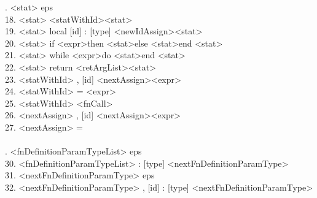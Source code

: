 \documentclass[a4paper, 12pt]{article}
\begin{document}
\begin{tabbing}
. \textless stat\textgreater                       \> \textrightarrow \>  eps \\
18. \textless stat\textgreater                       \> \textrightarrow \>  [id] \textless statWithId\textgreater \textless stat\textgreater \\
19. \textless stat\textgreater                       \> \textrightarrow \>  local [id] : [type] \textless newIdAssign\textgreater \textless stat\textgreater \\
20. \textless stat\textgreater                       \> \textrightarrow \>  if \textless expr\textgreater then \textless stat\textgreater else \textless stat\textgreater end \textless stat\textgreater \\
21. \textless stat\textgreater                       \> \textrightarrow \>  while \textless expr\textgreater do \textless stat\textgreater end \textless stat\textgreater \\
22. \textless stat\textgreater                       \> \textrightarrow \>  return \textless retArgList\textgreater \textless stat\textgreater  \\
23. \textless statWithId\textgreater                 \> \textrightarrow \>  , [id] \textless nextAssign\textgreater \textless expr\textgreater \\
24. \textless statWithId\textgreater                 \> \textrightarrow \>  = \textless expr\textgreater \\
25. \textless statWithId\textgreater                 \> \textrightarrow \>  \textless fnCall\textgreater \\
26. \textless nextAssign\textgreater                 \> \textrightarrow \>  , [id] \textless nextAssign\textgreater \textless expr\textgreater\\
27. \textless nextAssign\textgreater                 \> \textrightarrow \>  = \\ \\

. \textless fnDefinitionParamTypeList\textgreater  \> \textrightarrow \>  eps \\
30. \textless fnDefinitionParamTypeList\textgreater  \> \textrightarrow \>  [id] : [type] \textless nextFnDefinitionParamType\textgreater \\
31. \textless nextFnDefinitionParamType\textgreater  \> \textrightarrow \>  eps \\
32. \textless nextFnDefinitionParamType\textgreater  \> \textrightarrow \>  , [id] : [type] \textless nextFnDefinitionParamType\textgreater \\ \\


\end{tabbing}
\end{document}

